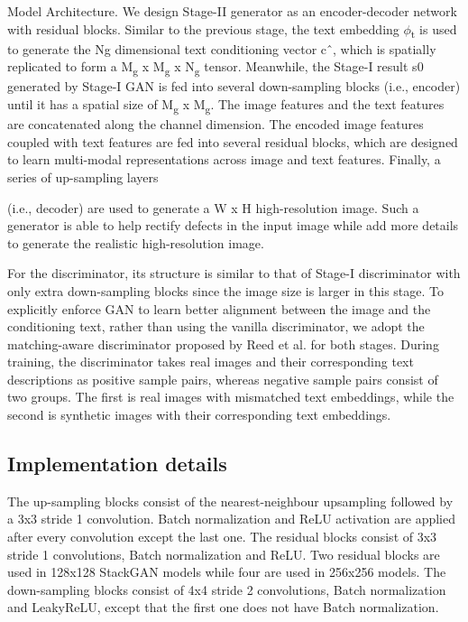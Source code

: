 \documentclass[a4paper,12pt,oneside]{article}
\begin{document}
Model Architecture. We design Stage-II generator as an encoder-decoder 
network with residual blocks. Similar to the previous stage, the text
embedding $\phi$\textsubscript{t} is used to generate the Ng dimensional text conditioning 
vector cˆ, which is spatially replicated to form a M\textsubscript{g} x
M\textsubscript{g} x N\textsubscript{g} tensor. Meanwhile, the Stage-I 
result s0 generated by Stage-I GAN is fed into several down-sampling blocks (i.e., encoder) until it has a spatial size of M\textsubscript{g} x M\textsubscript{g}. The image features and the text features are concatenated along the channel dimension. The encoded image features coupled with text features are fed into several residual blocks, which are designed to learn multi-modal representations across image and text features. Finally, a series of up-sampling layers 

(i.e., decoder) are used to generate a W x H high-resolution image. Such a generator is able to help rectify defects in the input image while add more details to generate the realistic high-resolution image. 

For the discriminator, its structure is similar to that of Stage-I discriminator with only extra down-sampling blocks since the image size is larger in this stage. To explicitly enforce GAN to learn better alignment between the image and the conditioning text, rather than using the vanilla discriminator, we adopt the matching-aware discriminator proposed by Reed et al. for both stages. During training, the discriminator takes real images and their corresponding text descriptions as positive sample pairs, whereas negative sample pairs consist of two groups. The first is real images with mismatched text embeddings, while the second is synthetic images with their corresponding text embeddings. 

\subsection{Implementation details}

The up-sampling blocks consist of the nearest-neighbour upsampling followed by a 3x3 stride 1 convolution. Batch normalization and ReLU activation are applied after every convolution except the last one. The residual blocks consist of 3x3 stride 1 convolutions, Batch normalization and ReLU. Two residual blocks are used in 128x128 StackGAN models while four are used in 256x256 models. The down-sampling blocks consist of 4x4 stride 2 convolutions, Batch normalization and LeakyReLU, except that the first one does not have Batch normalization. 
\end{document}

